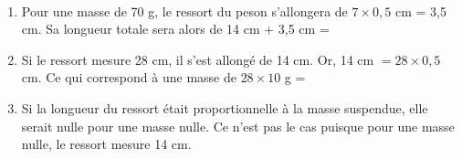 \ \\ [-5mm]
\begin{enumerate}
   \item Pour une masse de 70 g, le ressort du peson s'allongera de $7\times0,5$ cm = 3,5 cm. Sa longueur totale sera alors de 14 cm + 3,5 cm = 
   \item Si le ressort mesure 28 cm, il s'est allongé de 14 cm. Or, 14 cm $=28\times0,5$ cm. Ce qui correspond à une masse de  $28\times10$ g = 
   \item Si la longueur du ressort était proportionnelle à la masse suspendue, elle serait nulle pour une masse nulle. Ce n'est pas le cas puisque pour une masse nulle, le ressort mesure 14 cm. \\
\end{enumerate}
